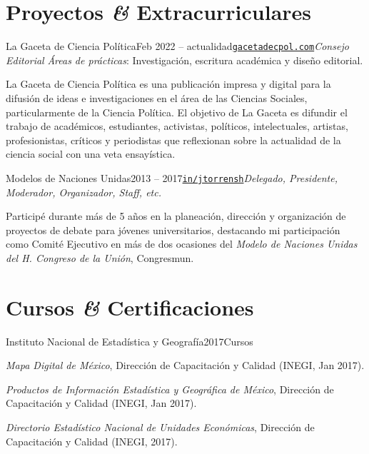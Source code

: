 \documentclass[letter]{resume}
\begin{document}
\section{Proyectos \textbf{\em\&} Extracurriculares}

\begin{content}
\begin{position}{La Gaceta de Ciencia Política}{Feb 2022 -- actualidad}{\normalfont\href{https://gacetadecpol.com/}{\texttt{gacetadecpol.com}}}{\emph{Consejo Editorial}}{}
  {\emph{Áreas de prácticas}}: Investigación, escritura académica y diseño editorial.
    \item La Gaceta de Ciencia Política es una publicación impresa y digital para la difusión de ideas e investigaciones en el área de las Ciencias Sociales, particularmente de la Ciencia Política. El objetivo de La Gaceta es difundir el trabajo de académicos, estudiantes, activistas, políticos, intelectuales, artistas, profesionistas, críticos y periodistas que reflexionan sobre la actualidad de la ciencia social con una veta ensayística.
\end{position}

\begin{position}{Modelos de Naciones Unidas}{2013 -- 2017}{\normalfont\href{https://www.linkedin.com/in/jtorrensh/}{\texttt{in/jtorrensh}}}{\emph{Delegado, Presidente, Moderador, Organizador, Staff, etc.}}{}
  \item Participé durante más de 5 años en la planeación, dirección y organización de proyectos de debate para jóvenes universitarios, destacando mi participación como Comité Ejecutivo en más de dos ocasiones del \emph{Modelo de Naciones Unidas del H. Congreso de la Unión}, Congresmun.
\end{position}

\sectionlineskip
\end{content}


\section{Cursos \textbf{\em\&} Certificaciones}

\begin{content}
\begin{position}{Instituto Nacional de Estadística y Geografía}{2017}{Cursos}{}{}
\item \emph{Mapa Digital de México}, Dirección de Capacitación y Calidad (INEGI, Jan 2017).
\item \emph{Productos de Información Estadística y Geográfica de México}, Dirección de Capacitación y Calidad (INEGI, Jan 2017).
\item \emph{Directorio Estadístico Nacional de Unidades Económicas}, Dirección de Capacitación y Calidad (INEGI, 2017).
\end{position}
\end{content}
\end{document}
